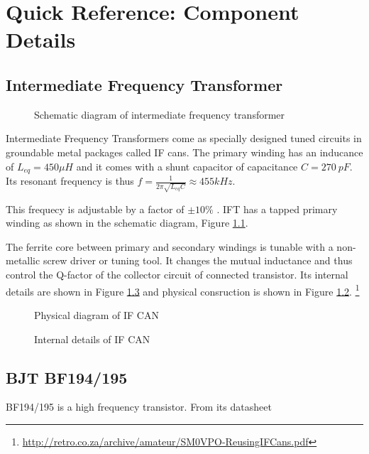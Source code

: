 \chapter {Quick Reference: Component Details}
\section{Intermediate Frequency Transformer}
\label{IFT}

\begin{figure}[ht]
\caption {Schematic diagram of intermediate frequency transformer}
\label{iftschem}
\end{figure}


Intermediate Frequency Transformers come as specially designed tuned circuits in groundable metal packages called IF cans. The primary winding has an inducance of $L_{eq}=450\mu H$ and it comes with a shunt capacitor of capacitance $C=270\ pF$. Its resonant frequency is thus $f=\frac{1}{2\pi\sqrt{L_{eq}C}}\approx 455 kHz$.

This frequecy is adjustable by a factor of $\pm 10 \%$ . IFT has a tapped primary winding as shown in the schematic diagram, Figure \ref{iftschem}. 

The ferrite core between primary and secondary windings is tunable with a non-metallic screw driver or tuning tool. It changes the mutual inductance and thus control the Q-factor of the collector circuit of connected transistor\cite{Tomasi}. Its internal details are shown in Figure \ref{ifcan2} and physical consruction is shown in Figure \ref{ifcan1}. \footnote{\url{http://retro.co.za/archive/amateur/SM0VPO-ReusingIFCans.pdf}}
\begin{figure}[ht]
\caption {Physical diagram of IF CAN}
\label{ifcan1}
\end{figure}
\begin{figure}
\caption {Internal details of IF CAN}

\label{ifcan2}
\end{figure}



\section{BJT BF194/195}
\label{BF194/195}
BF194/195 is a high frequency transistor. From its datasheet 

